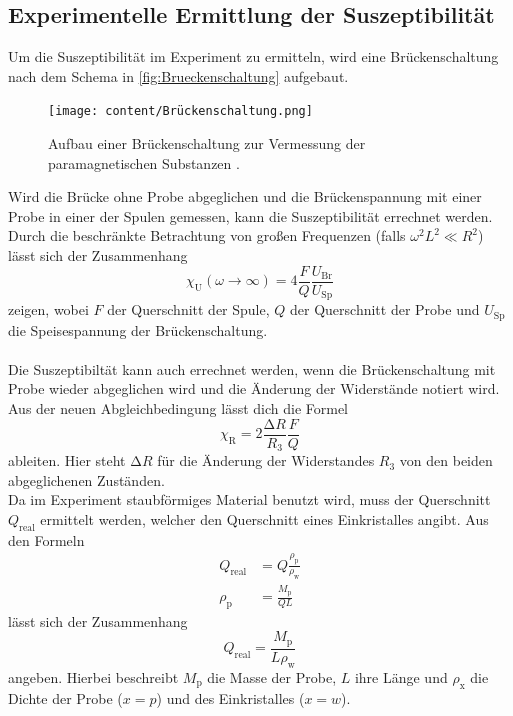 \subsection{Experimentelle Ermittlung der Suszeptibilität}
Um die Suszeptibilität im Experiment zu ermitteln, wird eine Brückenschaltung nach dem Schema in \autoref{fig:Brueckenschaltung} aufgebaut.
\begin{figure}
    \centering
    \texttt{[image: content/Brückenschaltung.png]}
    \caption{Aufbau einer Brückenschaltung zur Vermessung der paramagnetischen Substanzen \cite{anleitung}.}
    \label{fig:Brueckenschaltung}
\end{figure}
Wird die Brücke ohne Probe abgeglichen und die Brückenspannung mit einer Probe in einer der Spulen gemessen, kann die Suszeptibilität errechnet werden.
Durch die beschränkte Betrachtung von großen Frequenzen (falls $\omega^2L^2 \ll R^2$) lässt sich der Zusammenhang
\begin{equation}\label{eqn:chi_u}
    \chi_{\text{U}}(\omega\to\infty) = 4 \frac{F}{Q}\frac{U_{\text{Br}}}{U_{\text{Sp}}}
\end{equation}
zeigen, wobei $F$ der Querschnitt der Spule, $Q$ der Querschnitt der Probe und $U_{\text{Sp}}$ die Speisespannung der Brückenschaltung.\\
\\
Die Suszeptibiltät kann auch errechnet werden, wenn die Brückenschaltung mit Probe wieder abgeglichen wird und die Änderung der Widerstände notiert wird.
Aus der neuen Abgleichbedingung lässt dich die Formel 
\begin{equation}\label{eqn:chi_r}
    \chi_{\text{R}} = 2 \frac{\increment R}{R_3} \frac{F}{Q}
\end{equation}
ableiten.
Hier steht $\increment R$ für die Änderung der Widerstandes $R_3$ von den beiden abgeglichenen Zuständen.\\
Da im Experiment staubförmiges Material benutzt wird, muss der Querschnitt $Q_{\text{real}}$ ermittelt werden, welcher den Querschnitt eines Einkristalles angibt.
Aus den Formeln 
\begin{align*}
    Q_{\text{real}} &= Q \frac{\rho_{\text{p}}}{\rho_{\text{w}}}\\
    \rho_{\text{p}} &= \frac{M_{\text{p}}}{QL}
\end{align*}
lässt sich der Zusammenhang 
\begin{equation}\label{eqn:qreal}
    Q_{\text{real}} = \frac{M_{\text{p}}}{L \rho_{\text{w}}}
\end{equation}
angeben.
Hierbei beschreibt $M_{\text{p}}$ die Masse der Probe, $L$ ihre Länge und $\rho_{\text{x}}$ die Dichte der Probe ($x=p$) und des Einkristalles ($x=w$).

